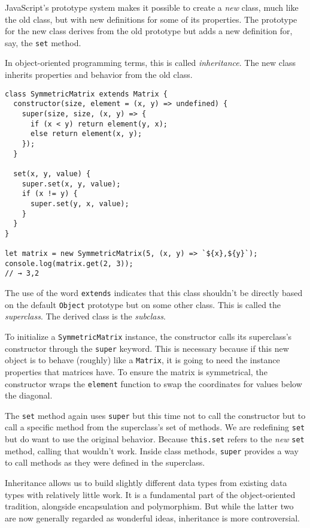 JavaScript's prototype system makes it possible to create a \emph{new} class, much like the old class, but with new definitions for some of its properties. The prototype for the new class derives from the old prototype but adds a new definition for, say, the \lstinline`set` method.

In object-oriented programming terms, this is called \emph{inheritance}. The new class inherits properties and behavior from the old class.

\begin{lstlisting}
class SymmetricMatrix extends Matrix {
  constructor(size, element = (x, y) => undefined) {
    super(size, size, (x, y) => {
      if (x < y) return element(y, x);
      else return element(x, y);
    });
  }

  set(x, y, value) {
    super.set(x, y, value);
    if (x != y) {
      super.set(y, x, value);
    }
  }
}

let matrix = new SymmetricMatrix(5, (x, y) => `${x},${y}`);
console.log(matrix.get(2, 3));
// → 3,2
\end{lstlisting}
\noindent

The use of the word \lstinline`extends` indicates that this class shouldn't be directly based on the default \lstinline`Object` prototype but on some other class. This is called the \emph{superclass}. The derived class is the \emph{subclass}.

To initialize a \lstinline`SymmetricMatrix` instance, the constructor calls its superclass's constructor through the \lstinline`super` keyword. This is necessary because if this new object is to behave (roughly) like a \lstinline`Matrix`, it is going to need the instance properties that matrices have. To ensure the matrix is symmetrical, the constructor wraps the \lstinline`element` function to swap the coordinates for values below the diagonal.

The \lstinline`set` method again uses \lstinline`super` but this time not to call the constructor but to call a specific method from the superclass's set of methods. We are redefining \lstinline`set` but do want to use the original behavior. Because \lstinline`this.set` refers to the \emph{new} \lstinline`set` method, calling that wouldn't work. Inside class methods, \lstinline`super` provides a way to call methods as they were defined in the superclass.

Inheritance allows us to build slightly different data types from existing data types with relatively little work. It is a fundamental part of the object-oriented tradition, alongside encapsulation and polymorphism. But while the latter two are now generally regarded as wonderful ideas, inheritance is more controversial.

